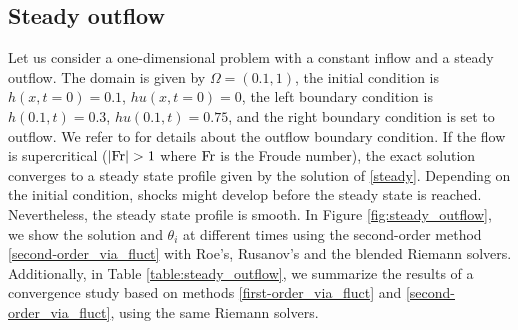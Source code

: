\documentclass[preprint, 11pt]{article}
\newcommand{\Fr}{{\rm Fr}}
\begin{document}

\subsection{Steady outflow}\label{sec:steady_outflow}
Let us consider a one-dimensional problem with a constant inflow and a steady outflow.
The domain is given by $\Omega=(0.1,1)$, the initial condition is
$h(x,t=0)=0.1$, $hu(x,t=0)=0$, the left boundary condition is $h(0.1,t)=0.3$, $hu(0.1,t)=0.75$,
and the right boundary condition is set to outflow.
We refer to \cite[\S 21.8.5]{leveque2002finite} for details about the outflow boundary condition.
If the flow is supercritical ($|\Fr|>1$ where $\Fr$ is the Froude number), the exact solution converges to a
steady state profile given by the solution of \eqref{steady}.
Depending on the initial condition, shocks might develop before the steady state is reached.
Nevertheless, the steady state profile is smooth.
In Figure \ref{fig:steady_outflow}, we show the solution and $\theta_i$ at different times using
the second-order method \eqref{second-order_via_fluct}
with Roe's, Rusanov's and the blended Riemann solvers.
Additionally, in Table \ref{table:steady_outflow}, we summarize the results of a convergence study
based on methods \eqref{first-order_via_fluct} and
\eqref{second-order_via_fluct}, using the same Riemann solvers.
\end{document}
